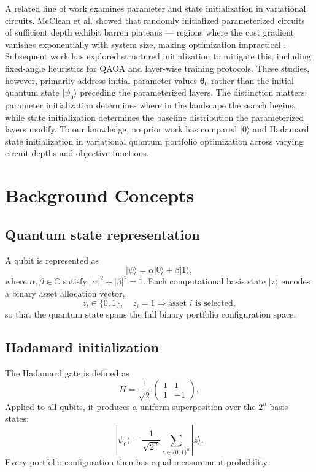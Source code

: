\documentclass[runningheads]{llncs}
\begin{document}
A related line of work examines parameter and state initialization in variational circuits. McClean et al. showed that randomly initialized parameterized circuits of sufficient depth exhibit barren plateaus --- regions where the cost gradient vanishes exponentially with system size, making optimization impractical \cite{mcclean2018barren}. Subsequent work has explored structured initialization to mitigate this, including fixed-angle heuristics for QAOA \cite{Wurtz_2021_fixed_angle} and layer-wise training protocols. These studies, however, primarily address initial parameter values $\boldsymbol{\theta}_0$ rather than the initial quantum state $|\psi_0\rangle$ preceding the parameterized layers. The distinction matters: parameter initialization determines where in the landscape the search begins, while state initialization determines the baseline distribution the parameterized layers modify. To our knowledge, no prior work has compared $|0\rangle$ and Hadamard state initialization in variational quantum portfolio optimization across varying circuit depths and objective functions.
\section{Background Concepts}

\subsection{Quantum state representation}
A qubit is represented as
\begin{equation}
    |\psi\rangle = \alpha|0\rangle + \beta|1\rangle, 
\end{equation}
where $\alpha,\beta \in \mathbb{C}$ satisfy $|\alpha|^2+|\beta|^2=1$. Each computational basis state $|z\rangle$ encodes a binary asset allocation vector,
\begin{equation}
    z_i \in \{0, 1\}, \quad z_i = 1 \Rightarrow 
    \text{asset } i \text{ is selected},
\end{equation}
so that the quantum state spans the full binary portfolio configuration space.

\subsection{Hadamard initialization}
The Hadamard gate is defined as
\begin{equation}
    H = \frac{1}{\sqrt{2}} \begin{pmatrix} 1 & 1 \\ 1 & -1 
    \end{pmatrix},
\end{equation}
Applied to all qubits, it produces a uniform superposition over the $2^n$ basis states:
\begin{equation}
    |\psi_0\rangle = \frac{1}{\sqrt{2^n}} 
    \sum_{z \in \{0,1\}^n} |z\rangle.
\end{equation}
Every portfolio configuration then has equal measurement probability.
\end{document}
